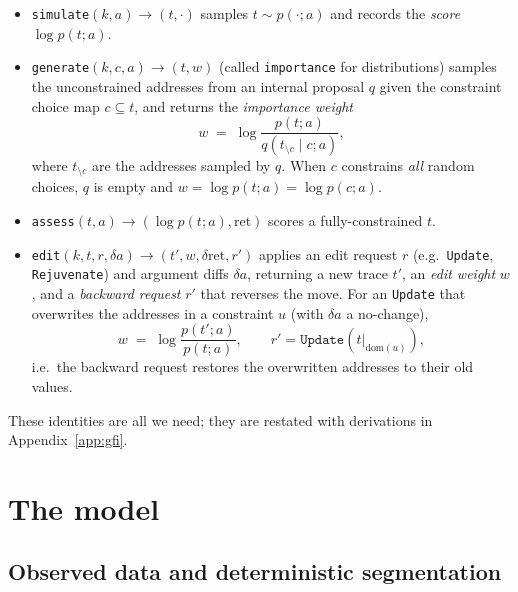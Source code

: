 \documentclass[11pt]{article}
\newcommand{\given}{\mid}
\newcommand{\code}[1]{\texttt{#1}}
\begin{document}
\begin{itemize}[leftmargin=1.4em]
  \item \code{simulate}$(k, a) \to (t, \cdot)$ samples $t \sim p(\cdot; a)$ and records the
        \emph{score} $\log p(t; a)$.
  \item \code{generate}$(k, c, a) \to (t, w)$ (called \code{importance} for distributions) samples
        the unconstrained addresses from an internal proposal $q$ given the constraint choice map
        $c \subseteq t$, and returns the \emph{importance weight}
        \begin{equation}\label{eq:gen-weight}
          w \;=\; \log \frac{p(t; a)}{q(t_{\setminus c} \given c; a)},
        \end{equation}
        where $t_{\setminus c}$ are the addresses sampled by $q$. When $c$ constrains \emph{all}
        random choices, $q$ is empty and $w = \log p(t;a) = \log p(c; a)$.
  \item \code{assess}$(t, a) \to (\log p(t; a), \mathrm{ret})$ scores a fully-constrained $t$.
  \item \code{edit}$(k, t, r, \delta a) \to (t', w, \delta\mathrm{ret}, r')$ applies an edit request
        $r$ (e.g.\ \code{Update}, \code{Rejuvenate}) and argument diffs $\delta a$, returning a new
        trace $t'$, an \emph{edit weight} $w$, and a \emph{backward request} $r'$ that reverses the
        move. For an \code{Update} that overwrites the addresses in a constraint $u$ (with
        $\delta a$ a no-change),
        \begin{equation}\label{eq:update-weight}
          w \;=\; \log \frac{p(t'; a)}{p(t; a)},
          \qquad r' = \code{Update}(t|_{\mathrm{dom}(u)}),
        \end{equation}
        i.e.\ the backward request restores the overwritten addresses to their old values.
\end{itemize}

These identities are all we need; they are restated with derivations in Appendix~\ref{app:gfi}.

\section{The model}
\label{sec:model}

\subsection{Observed data and deterministic segmentation}
\end{document}
